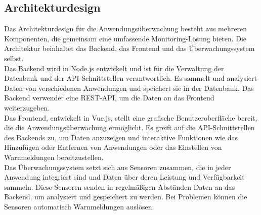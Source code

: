 \begin{flushleft}
	\subsection{Architekturdesign}
	Das Architekturdesign für die Anwendungsüberwachung besteht aus mehreren Komponenten, die gemeinsam eine umfassende Monitoring-Lösung bieten. Die Architektur beinhaltet das Backend, das Frontend und das Überwachungssystem selbst.
	\\
	Das Backend wird in Node.js entwickelt und ist für die Verwaltung der Datenbank und der API-Schnittstellen verantwortlich. Es sammelt und analysiert Daten von verschiedenen Anwendungen und speichert sie in der Datenbank. Das Backend verwendet eine REST-API, um die Daten an das Frontend weiterzugeben.
	\\
	Das Frontend, entwickelt in Vue.js, stellt eine grafische Benutzeroberfläche bereit, die die Anwendungsüberwachung ermöglicht. Es greift auf die API-Schnittstellen des Backends zu, um Daten anzuzeigen und interaktive Funktionen wie das Hinzufügen oder Entfernen von Anwendungen oder das Einstellen von Warnmeldungen bereitzustellen.
	\\
	Das Überwachungssystem setzt sich aus Sensoren zusammen, die in jeder Anwendung integriert sind und Daten über deren Leistung und Verfügbarkeit sammeln. Diese Sensoren senden in regelmäßigen Abständen Daten an das Backend, um analysiert und gespeichert zu werden. Bei Problemen können die Sensoren automatisch Warnmeldungen auslösen.

\end{flushleft}

